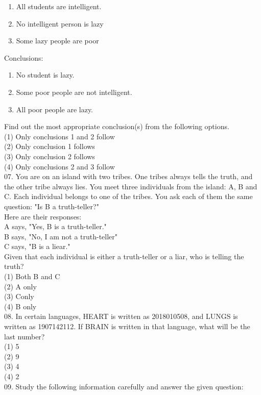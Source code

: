 \documentclass[10pt]{article}
\begin{document}
\begin{enumerate}
  \item All students are intelligent.
  \item No intelligent person is lazy
  \item Some lazy people are poor
\end{enumerate}

Conclusions:

\begin{enumerate}
  \item No student is lazy.
  \item Some poor people are not intelligent.
  \item All poor people are lazy.
\end{enumerate}

Find out the most appropriate conclusion(s) from the following options.\\
(1) Only conclusions 1 and 2 follow\\
(2) Only conclusion 1 follows\\
(3) Only conclusion 2 follows\\
(4) Only conclusions 2 and 3 follow\\
07. You are on an island with two tribes. One tribes always tells the truth, and the other tribe always lies. You meet three individuals from the island: A, B and C. Each individual belongs to one of the tribes. You ask each of them the same question: "Is B a truth-teller?"\\
Here are their responses:\\
A says, "Yes, B is a truth-teller."\\
B says, "No, I am not a truth-teller"\\
C says, "B is a liear."\\
Given that each individual is either a truth-teller or a liar, who is telling the truth?\\
(1) Both B and C\\
(2) A only\\
(3) Conly\\
(4) B only\\
08. In certain languages, HEART is written as 2018010508, and LUNGS is written as 1907142112. If BRAIN is written in that language, what will be the last number?\\
(1) 5\\
(2) 9\\
(3) 4\\
(4) 2\\
09. Study the following information carefully and answer the given question:
\end{document}
